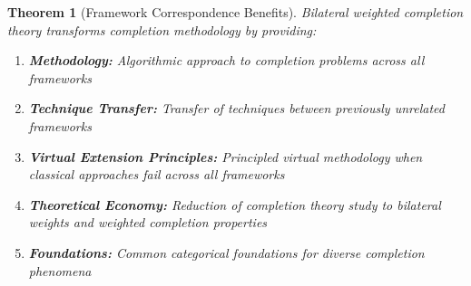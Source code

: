 \documentclass[11pt]{article}
\theoremstyle{plain}
\newtheorem{theorem}{Theorem}[section]
\theoremstyle{definition}
\theoremstyle{remark}
\begin{document}
\begin{theorem}[Framework Correspondence Benefits]\label{thm:unification-benefits}
Bilateral weighted completion theory transforms completion methodology by providing:

\begin{enumerate}
\item \textbf{Methodology:} Algorithmic approach to completion problems across all frameworks

\item \textbf{Technique Transfer:} Transfer of techniques between previously unrelated frameworks

\item \textbf{Virtual Extension Principles:} Principled virtual methodology when classical approaches fail across all frameworks

\item \textbf{Theoretical Economy:} Reduction of completion theory study to bilateral weights and weighted completion properties

\item \textbf{Foundations:} Common categorical foundations for diverse completion phenomena
\end{enumerate}
\end{theorem}
\end{document}
